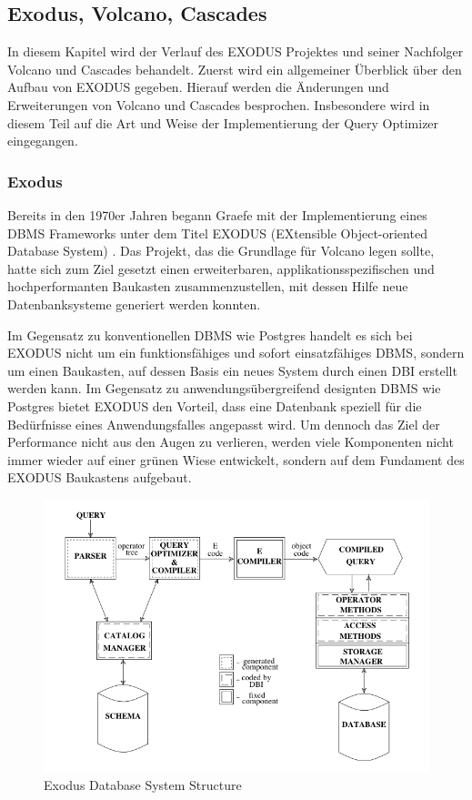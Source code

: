 \subsection{Exodus, Volcano, Cascades}

In diesem Kapitel wird der Verlauf des EXODUS Projektes und seiner Nachfolger Volcano und Cascades behandelt. Zuerst wird ein allgemeiner Überblick über den Aufbau von EXODUS gegeben. Hierauf werden die Änderungen und Erweiterungen von Volcano und Cascades besprochen. Insbesondere wird in diesem Teil auf die Art und Weise der Implementierung der Query Optimizer eingegangen. 

\subsubsection{Exodus}


Bereits in den 1970er Jahren begann Graefe mit der Implementierung eines DBMS Frameworks unter dem Titel EXODUS (EXtensible Object-oriented Database System) \cite{carey1990exodus} . Das Projekt, das die Grundlage für Volcano legen sollte, hatte sich zum Ziel gesetzt einen erweiterbaren, applikationsspezifischen und hochperformanten Baukasten zusammenzustellen, mit dessen Hilfe neue Datenbanksysteme generiert werden konnten. 

Im Gegensatz zu konventionellen DBMS wie Postgres handelt es sich bei EXODUS nicht um ein funktionsfähiges und sofort einsatzfähiges DBMS, sondern um einen Baukasten, auf dessen Basis ein neues System durch einen DBI erstellt werden kann. Im Gegensatz zu anwendungsübergreifend designten DBMS wie Postgres bietet EXODUS den Vorteil, dass eine Datenbank speziell für die Bedürfnisse eines Anwendungsfalles angepasst wird. Um dennoch das Ziel der Performance nicht aus den Augen zu verlieren, werden viele Komponenten nicht immer wieder auf einer grünen Wiese entwickelt, sondern auf dem Fundament des EXODUS Baukastens aufgebaut.

\begin{figure}[h]
  \centering
  \includegraphics[width=\textwidth]{02_Grundlagen/ExodusDatabaseSystemStructure.png}
  \caption{Exodus Database System Structure}
\end{figure}

